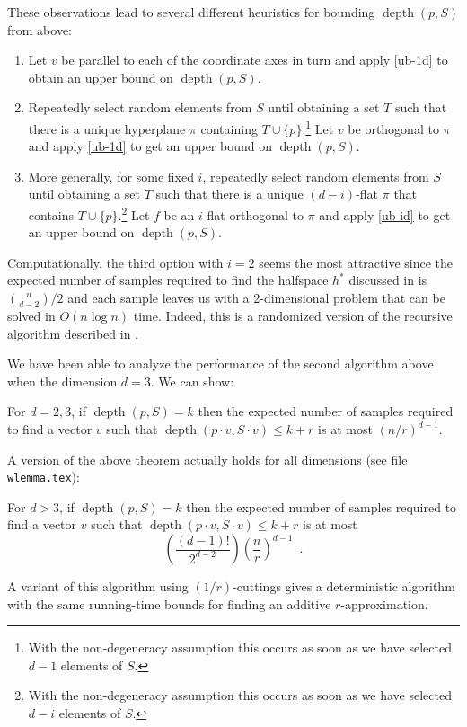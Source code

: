 \documentclass[lotsofwhite,12pt]{patmorin}
\DeclareMathOperator{\td}{depth}
\begin{document}
These observations lead to several different heuristics for bounding
$\td(p,S)$ from above:

\begin{enumerate}
\item Let $v$ be parallel to each of the coordinate axes in turn and
apply \eqref{ub-1d} to obtain an upper bound on $\td(p,S)$.

\item Repeatedly select random elements from $S$ until obtaining a set
$T$ such that there is a unique hyperplane $\pi$ containing
$T\cup\{p\}$.\footnote{With the non-degeneracy assumption this occurs
as soon as we have selected $d-1$ elements of $S$.} Let $v$ be
orthogonal to $\pi$ and apply \eqref{ub-1d} to get an upper bound on
$\td(p,S)$.

\item More generally, for some fixed $i$, repeatedly select random
elements from $S$ until obtaining a set $T$ such that there is a
unique $(d-i)$-flat $\pi$  that contains $T\cup\{p\}$.\footnote{With
the non-degeneracy assumption this occurs as soon as we have selected
$d-i$ elements of $S$.}  Let $f$ be an
$i$-flat orthogonal to $\pi$ and apply \eqref{ub-id} to get an upper
bound on $\td(p,S)$.

\end{enumerate}


Computationally, the third option with $i=2$ seems the most attractive
since the expected number of samples required to find the halfspace
$h^*$ discussed in  is ${n\choose d-2}/2$ and each
sample leaves us with a 2-dimensional problem that can be solved in
$O(n\log n)$ time.  Indeed, this is a randomized version of the
recursive algorithm described in .

 We have been able to analyze the
performance of the second algorithm above when the dimension $d=3$. We
can show:
\begin{thm}
For $d=2,3$, if $\td(p,S)=k$ then the expected number of samples required to
find a vector $v$ such that $\td(p\cdot v,S\cdot v) \le k+r$ is at
most $(n/r)^{d-1}$.
\end{thm}
A version of the above theorem actually holds for all dimensions (see
file \texttt{wlemma.tex}):
\begin{thm}
For $d>3$, if $\td(p,S)=k$ then the expected number of samples required to
find a vector $v$ such that $\td(p\cdot v,S\cdot v) \le k+r$ is at
most
\[
   \left(\frac{(d-1)!}{2^{d-2}} \right)\left(\frac{n}{r}\right)^{d-1}
     \enspace .
\]
\end{thm}
A variant of this algorithm using $(1/r)$-cuttings gives a
deterministic algorithm with the same running-time bounds for finding
an additive $r$-approximation.
\end{document}
